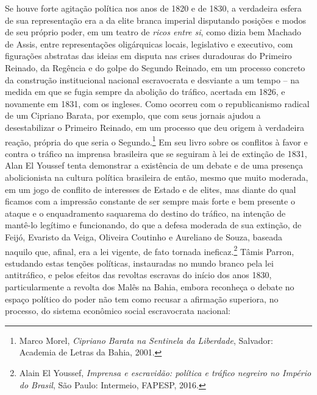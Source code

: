 Se houve forte agitação política nos anos de 1820 e de 1830, a
verdadeira esfera de sua representação era a da elite branca imperial
disputando posições e modos de seu próprio poder, em um teatro de
\emph{ricos entre si}, como dizia bem Machado de Assis, entre
representações oligárquicas locais, legislativo e executivo, com
figurações abstratas das ideias em disputa nas crises duradouras do
Primeiro Reinado, da Regência e do golpe do Segundo Reinado, em um
processo concreto da construção institucional nacional escravocrata e
desviante a um tempo -- na medida em que se fugia sempre da abolição do
tráfico, acertada em 1826, e novamente em 1831, com os ingleses. Como
ocorreu com o republicanismo radical de um Cipriano Barata, por exemplo,
que com seus jornais ajudou a desestabilizar o Primeiro Reinado, em um
processo que deu origem à verdadeira reação, própria do que seria o
Segundo.\footnote{Marco Morel, \emph{Cipriano Barata na Sentinela da
  Liberdade}, Salvador: Academia de Letras da Bahia, 2001.} Em seu livro
sobre os conflitos à favor e contra o tráfico na imprensa brasileira que
se seguiram à lei de extinção de 1831, Alan El Youssef tenta demonstrar
a existência de um debate e de uma presença abolicionista na cultura
política brasileira de então, mesmo que muito moderada, em um jogo de
conflito de interesses de Estado e de elites, mas diante do qual ficamos
com a impressão constante de ser sempre mais forte e bem presente o
ataque e o enquadramento saquarema do destino do tráfico, na intenção de
mantê-lo legítimo e funcionando, do que a defesa moderada de sua
extinção, de Feijó, Evaristo da Veiga, Oliveira Coutinho e Aureliano de
Souza, baseada naquilo que, afinal, era a lei vigente, de fato tornada
ineficaz.\footnote{Alain El Youssef, \emph{Imprensa e escravidão:
  política e tráfico negreiro no Império do Brasil}, São Paulo:
  Intermeio, FAPESP, 2016.} Tâmis Parron, estudando estas tenções
políticas, instauradas no mundo branco pela lei antitráfico, e pelos
efeitos das revoltas escravas do início dos anos 1830, particularmente a
revolta dos Malês na Bahia, embora reconheça o debate no espaço político
do poder não tem como recusar a afirmação superiora, no processo, do
sistema econômico social escravocrata nacional:

